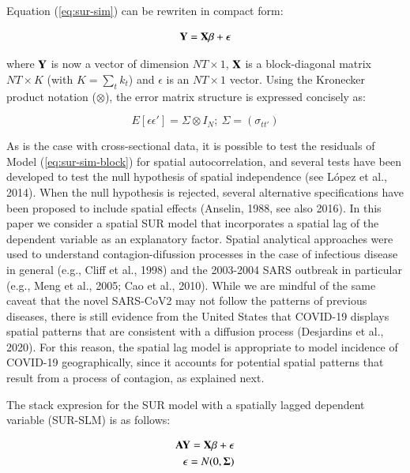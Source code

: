 \documentclass[]{elsarticle} %
\begin{document}
Equation (\ref{eq:sur-sim}) can be rewriten in compact form:

\begin{equation}
\bf{Y} = \bf{X} \beta + \epsilon
\label{eq:sur-sim-block}
\end{equation}

\noindent where \(\bf{Y}\) is now a vector of dimension \(NT \times 1\),
\(\bf{X}\) is a block-diagonal matrix \(NT \times K\) (with
\(K = \sum_t{k_t}\)) and \(\epsilon\) is an \(NT \times 1\) vector.
Using the Kronecker product notation (\(\otimes\)), the error matrix
structure is expressed concisely as:

\begin{equation}
E[\epsilon \epsilon']=\Sigma \otimes I_N ; \ \Sigma=(\sigma_{tt'})
\end{equation}

As is the case with cross-sectional data, it is possible to test the
residuals of Model (\ref{eq:sur-sim-block}) for spatial autocorrelation,
and several tests have been developed to test the null hypothesis of
spatial independence (see López et al., 2014). When the null hypothesis
is rejected, several alternative specifications have been proposed to
include spatial effects (Anselin, 1988, see also 2016). In this paper we
consider a spatial SUR model that incorporates a spatial lag of the
dependent variable as an explanatory factor. Spatial analytical
approaches were used to understand contagion-difussion processes in the
case of infectious disease in general (e.g., Cliff et al., 1998) and the
2003-2004 SARS outbreak in particular (e.g., Meng et al., 2005; Cao et
al., 2010). While we are mindful of the same caveat that the novel
SARS-CoV2 may not follow the patterns of previous diseases, there is
still evidence from the United States that COVID-19 displays spatial
patterns that are consistent with a diffusion process (Desjardins et
al., 2020). For this reason, the spatial lag model is appropriate to
model incidence of COVID-19 geographically, since it accounts for
potential spatial patterns that result from a process of contagion, as
explained next.

The stack expresion for the SUR model with a spatially lagged dependent
variable (SUR-SLM) is as follows:

\begin{equation}
\label{eq:sur-slm}
\begin{aligned}
\bf{AY} = \bf{X} \beta + \epsilon \\
\epsilon =N(0,\bf{\Sigma})
\end{aligned}
\end{equation}
\end{document}
